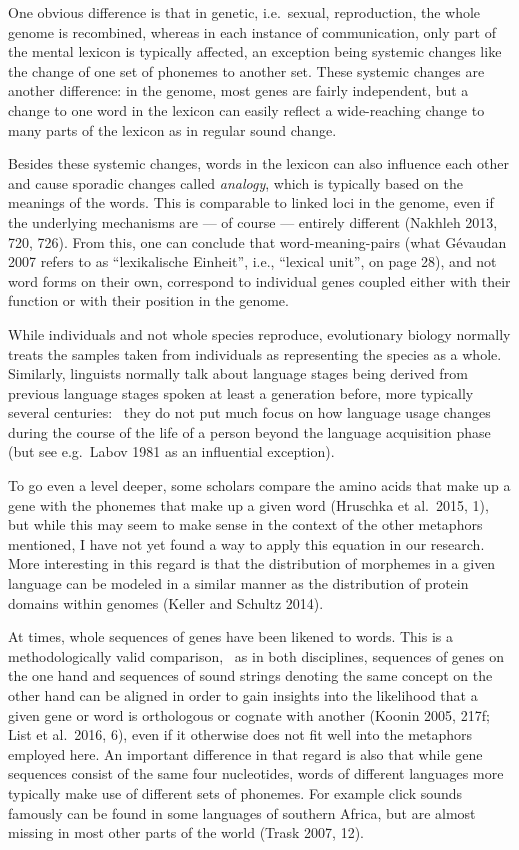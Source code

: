 \documentclass[
  a4paper,
  14pt,
  oneside,
  tablecaptionabove
]{scrbook}
\begin{document}
One obvious difference is that in genetic, i.e.~sexual, reproduction,
the whole genome is recombined, whereas in each instance of
communication, only part of the mental lexicon is typically affected, an
exception being systemic changes like the change of one set of phonemes
to another set. These systemic changes are another difference: in the
genome, most genes are fairly independent, but a change to one word in
the lexicon can easily reflect a wide-reaching change to many parts of
the lexicon as in regular sound change.

Besides these systemic changes, words in the lexicon can also influence
each other and cause sporadic changes called \emph{analogy}, which is
typically based on the meanings of the words. This is comparable to
linked loci in the genome, even if the underlying mechanisms are ­­---
of course --- entirely different (Nakhleh 2013, 720, 726). From this,
one can conclude that word-meaning-pairs (what Gévaudan 2007 refers to
as \enquote{lexikalische Einheit}, i.e., \enquote{lexical unit}, on page
28), and not word forms on their own, correspond to individual genes
coupled either with their function or with their position in the genome.

While individuals and not whole species reproduce, evolutionary biology
normally treats the samples taken from individuals as representing the
species as a whole. Similarly, linguists normally talk about language
stages being derived from previous language stages spoken at least a
generation before, more typically several centuries:~ they do not put
much focus on how language usage changes during the course of the life
of a person beyond the language acquisition phase (but see e.g.~Labov
1981 as an influential exception).

To go even a level deeper, some scholars compare the amino acids that
make up a gene with the phonemes that make up a given word (Hruschka et
al.~2015, 1), but while this may seem to make sense in the context of
the other metaphors mentioned, I have not yet found a way to apply this
equation in our research. More interesting in this regard is that the
distribution of morphemes in a given language can be modeled in a
similar manner as the distribution of protein domains within genomes
(Keller and Schultz 2014).

At times, whole sequences of genes have been likened to words. This is a
methodologically valid comparison,~ as in both disciplines, sequences of
genes on the one hand and sequences of sound strings denoting the same
concept on the other hand can be aligned in order to gain insights into
the likelihood that a given gene or word is orthologous or cognate with
another (Koonin 2005, 217f; List et al.~2016, 6), even if it otherwise
does not fit well into the metaphors employed here. An important
difference in that regard is also that while gene sequences consist of
the same four nucleotides, words of different languages more typically
make use of different sets of phonemes. For example click sounds
famously can be found in some languages of southern Africa, but are
almost missing in most other parts of the world (Trask 2007, 12).
\end{document}
